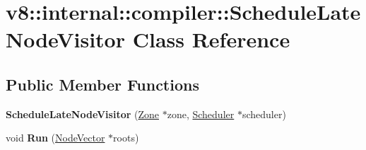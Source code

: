 \hypertarget{classv8_1_1internal_1_1compiler_1_1_schedule_late_node_visitor}{}\section{v8\+:\+:internal\+:\+:compiler\+:\+:Schedule\+Late\+Node\+Visitor Class Reference}
\label{classv8_1_1internal_1_1compiler_1_1_schedule_late_node_visitor}
\subsection*{Public Member Functions}
\begin{DoxyCompactItemize}
\item 
{\bfseries Schedule\+Late\+Node\+Visitor} (\hyperlink{classv8_1_1internal_1_1_zone}{Zone} $\ast$zone, \hyperlink{classv8_1_1internal_1_1compiler_1_1_scheduler}{Scheduler} $\ast$scheduler)\hypertarget{classv8_1_1internal_1_1compiler_1_1_schedule_late_node_visitor_a152de8d44321988026d0e261d1421ffa}{}\label{classv8_1_1internal_1_1compiler_1_1_schedule_late_node_visitor_a152de8d44321988026d0e261d1421ffa}

\item 
void {\bfseries Run} (\hyperlink{classv8_1_1internal_1_1_zone_vector}{Node\+Vector} $\ast$roots)\hypertarget{classv8_1_1internal_1_1compiler_1_1_schedule_late_node_visitor_a315e9a9843cfe9dc2bc80b407041b51e}{}\label{classv8_1_1internal_1_1compiler_1_1_schedule_late_node_visitor_a315e9a9843cfe9dc2bc80b407041b51e}

\end{DoxyCompactItemize}
